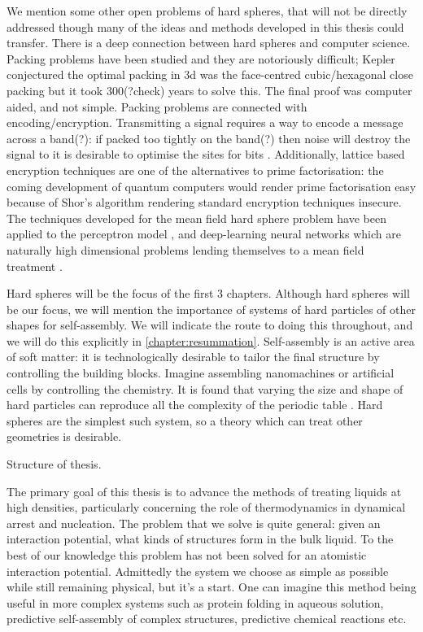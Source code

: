 \documentclass[11pt,twoside]{report}
\begin{document}
We mention some other open problems of hard spheres, that will not be directly addressed though many of the ideas and methods developed in this thesis could transfer.
There is a deep connection between hard spheres and computer science.
Packing problems have been studied \cite{Cohn2016,Conway1999} and they are notoriously difficult; Kepler conjectured the optimal packing in 3d was the face-centred cubic/hexagonal close packing but it took 300(?check) years to solve this.
The final proof was computer aided, and not simple.
Packing problems are connected with encoding/encryption.
Transmitting a signal requires a way to encode a message across a band(?): if packed too tightly on the band(?) then noise will destroy the signal to it is desirable to optimise the sites for bits \cite{Cohn,?,?}.
Additionally, lattice based encryption techniques are one of the alternatives to prime factorisation: the coming development of quantum computers \cite{?,?} would render prime factorisation easy because of Shor's algorithm \cite{Shor?} rendering standard encryption techniques insecure.
The techniques developed for the mean field hard sphere problem have been applied to the perceptron model \cite{?}, and deep-learning neural networks which are naturally high dimensional problems lending themselves to a mean field treatment \cite{?}.

Hard spheres will be the focus of the first 3 chapters.
Although hard spheres will be our focus, we will mention the importance of systems of hard particles of other shapes for self-assembly.
We will indicate the route to doing this throughout, and we will do this explicitly in \ref{chapter:resummation}.
Self-assembly is an active area of soft matter: it is technologically desirable to tailor the final structure by controlling the building blocks.
Imagine assembling nanomachines or artificial cells by controlling the chemistry.
It is found that varying the size and shape of hard particles can reproduce all the complexity of the periodic table \cite{Glotzer?,Dijkstra?}.
Hard spheres are the simplest such system, so a theory which can treat other geometries is desirable.

Structure of thesis.

The primary goal of this thesis is to advance the methods of treating liquids at high densities, particularly concerning the role of thermodynamics in dynamical arrest and nucleation.
The problem that we solve is quite general: given an interaction potential, what kinds of structures form in the bulk liquid.
To the best of our knowledge this problem has not been solved for an atomistic interaction potential.
Admittedly the system we choose as simple as possible while still remaining physical, but it's a start.
One can imagine this method being useful in more complex systems such as protein folding in aqueous solution, predictive self-assembly of complex structures, predictive chemical reactions etc.
\end{document}
